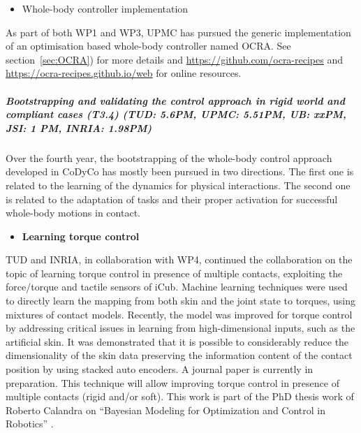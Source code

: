 \begin{itemize}
\item {Whole-body controller implementation}
\end{itemize}
As part of both WP1 and WP3, UPMC has pursued the generic implementation of an optimisation based whole-body controller named OCRA. See section~\ref{sec:OCRA}) for more details and \url{https://github.com/ocra-recipes} and \url{https://ocra-recipes.github.io/web} for online resources.

\subparagraph{Bootstrapping and validating the control approach in rigid world and compliant cases (T3.4) (TUD: 5.6PM, UPMC: 5.51PM, UB: xxPM, JSI: 1 PM, INRIA: 1.98PM)}

Over the fourth year, the bootstrapping of the whole-body control approach developed in CoDyCo has mostly been pursued in two directions. The first one is related to the learning of the dynamics for physical interactions. The second one is related to the adaptation of tasks and their proper activation for successful whole-body motions in contact.

\begin{itemize}
\item \textbf{Learning torque control}
\end{itemize}
TUD and INRIA, in collaboration with WP4, continued the collaboration on the topic of learning torque control in presence of multiple contacts, exploiting the force/torque and tactile sensors of iCub. Machine learning techniques were used to directly learn the mapping from both skin and the joint state to torques, using mixtures of contact models. Recently, the model was improved for torque control by addressing critical issues in learning from high-dimensional inputs, such as the artificial skin. It was demonstrated that it is possible to considerably reduce the dimensionality of the skin data preserving the information content of the contact position by using stacked auto encoders. A journal paper is currently in preparation. This technique will allow improving torque control in presence of multiple contacts (rigid and/or soft). This work is part of the PhD thesis work of Roberto Calandra on ``Bayesian Modeling for Optimization and Control in Robotics'' \cite{calandra2016PhD}.\\

